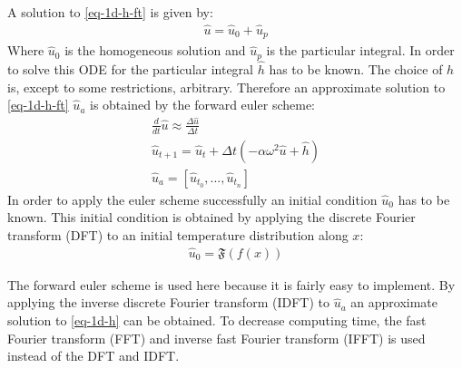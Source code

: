 A solution to \ref{eq-1d-h-ft} is given by:
\begin{gather}
\hat{u} = \hat{u}_{0} + \hat{u}_{p}
\end{gather}
Where \(\hat{u}_{0}\) is the homogeneous solution and \(\hat{u}_{p}\) is the particular integral.
In order to solve this ODE for the particular integral \(\hat{h}\) has to be known. \cite{Papula2015}
The choice of \(h\) is, except to some restrictions, arbitrary.
Therefore an approximate solution to \ref{eq-1d-h-ft} \(\hat{u}_{a}\) is obtained by the forward euler scheme:
\begin{gather}
\frac{d}{dt} \hat{u} \approx \frac{\Delta \hat{u}}{\Delta t} \\
\hat{u}_{t+1} = \hat{u}_{t} + \Delta t (-\alpha\omega^{2}\hat{u} + \hat{h}) \label{eq-1d-h-es} \\
\hat{u}_{a} = [\hat{u}_{t_{0}}, ..., \hat{u}_{t_{n}}]
\end{gather}
In order to apply the euler scheme successfully an initial condition   \(\hat{u}_{0}\) has to be known. 
This initial condition is obtained by applying the discrete Fourier transform (DFT) to an initial temperature distribution along \(x\):
\begin{gather}
\hat{u}_{0} = \mathfrak{F}(f(x)) 
\end{gather} 
\cite{Gustafsson2011b}

The forward euler scheme is used here because it is fairly easy to implement.
By applying the  inverse discrete Fourier transform (IDFT) to \(\hat{u}_{a}\) an approximate solution to \ref{eq-1d-h} can be obtained.
To decrease computing time, the fast Fourier transform (FFT) and inverse fast Fourier transform (IFFT) is used instead of the DFT and IDFT.
